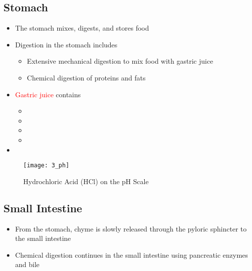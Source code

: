\documentclass[title={Chapter 3}]{fdsn201notes}
\begin{document}
\subsection{Stomach}\label{subsec:digestion-stomach}
\begin{itemize}
	\item The stomach mixes, digests, and stores food
	\item Digestion in the stomach includes
	\begin{itemize}
		\item Extensive mechanical digestion to mix food with gastric juice
		\item Chemical digestion of proteins and fats
	\end{itemize}
	\item \textcolor{red}{Gastric juice} contains
	\begin{itemize}
		\item {}
		\item {}
		\item {}
		\item {}
	\end{itemize}
	\item {}
\end{itemize}

\begin{figure}[H]
	\centering
	\texttt{[image: 3\_ph]}
	\caption{Hydrochloric Acid (HCl) on the pH Scale}
	\label{fig:ph}
\end{figure}

\subsection{Small Intestine}\label{subsec:small-intestine}
\begin{itemize}
	\item From the stomach, chyme is slowly released through the pyloric sphincter to the small intestine
	\item Chemical digestion continues in the small intestine using pancreatic enzymes and bile
\end{itemize}
\end{document}

